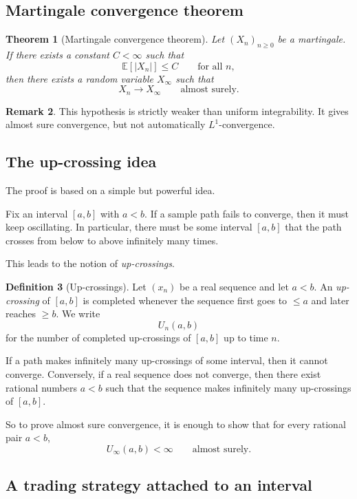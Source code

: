 \documentclass[11pt]{article}
\newtheorem{theorem}{Theorem}[section]
\theoremstyle{definition}
\newtheorem{definition}[theorem]{Definition}
\newtheorem{remark}[theorem]{Remark}
\begin{document}
\subsection{Martingale convergence theorem}

\begin{theorem}[Martingale convergence theorem]
Let \((X_n)_{n\ge 0}\) be a martingale. If there exists a constant \(C<\infty\) such that
\[
\mathbb E[|X_n|]\le C
\qquad \text{for all } n,
\]
then there exists a random variable \(X_\infty\) such that
\[
X_n\to X_\infty
\qquad \text{almost surely.}
\]
\end{theorem}

\begin{remark}
This hypothesis is strictly weaker than uniform integrability. It gives almost sure convergence, but not automatically \(L^1\)-convergence.
\end{remark}

\subsection{The up-crossing idea}

The proof is based on a simple but powerful idea.

Fix an interval \([a,b]\) with \(a<b\). If a sample path fails to converge, then it must keep oscillating. In particular, there must be some interval \([a,b]\) that the path crosses from below to above infinitely many times.

This leads to the notion of \emph{up-crossings}.

\begin{definition}[Up-crossings]
Let \((x_n)\) be a real sequence and let \(a<b\). An \emph{up-crossing} of \([a,b]\) is completed whenever the sequence first goes to \(\le a\) and later reaches \(\ge b\). We write
\[
U_n(a,b)
\]
for the number of completed up-crossings of \([a,b]\) up to time \(n\).
\end{definition}

If a path makes infinitely many up-crossings of some interval, then it cannot converge.
Conversely, if a real sequence does not converge, then there exist rational numbers \(a<b\) such that the sequence makes infinitely many up-crossings of \([a,b]\).

So to prove almost sure convergence, it is enough to show that for every rational pair \(a<b\),
\[
U_\infty(a,b)<\infty
\qquad \text{almost surely.}
\]

\subsection{A trading strategy attached to an interval}
\end{document}
